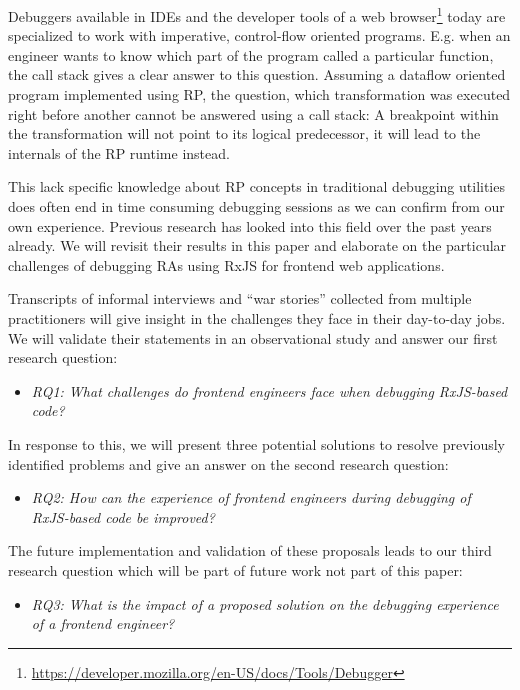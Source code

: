 \documentclass[12pt,a4paper]{article}
\begin{document}
Debuggers available in IDEs and the developer tools of a web browser\footnote{\url{https://developer.mozilla.org/en-US/docs/Tools/Debugger}} today are specialized to work with imperative, control-flow oriented programs. E.g. when an engineer wants to know which part of the program called a particular function, the call stack gives a clear answer to this question. Assuming a dataflow oriented program implemented using RP, the question, which transformation was executed right before another cannot be answered using a call stack: A breakpoint within the transformation will not point to its logical predecessor, it will lead to the internals of the RP runtime instead.

This lack specific knowledge about RP concepts in traditional debugging utilities does often end in time consuming debugging sessions as we can confirm from our own experience. Previous research has looked into this field \cite{10.1145/2577080.2577083} \cite{10.1145/2884781.2884815} \cite{10.1145/3180155.3180156} over the past years already. We will revisit their results in this paper and elaborate on the particular challenges of debugging RAs using RxJS for frontend web applications.

Transcripts of informal interviews and ``war stories'' collected from multiple practitioners will give insight in the challenges they face in their day-to-day jobs. We will validate their statements in an observational study and answer our first research question:

\begin{itemize}
	\item \emph{RQ1: What challenges do frontend engineers face when debugging RxJS-based code?}
\end{itemize}

In response to this, we will present three potential solutions to resolve previously identified problems and give an answer on the second research question:

\begin{itemize}
	\item \emph{RQ2: How can the experience of frontend engineers during debugging of RxJS-based code be improved?}
\end{itemize}

The future implementation and validation of these proposals leads to our third research question which will be part of future work not part of this paper:

\begin{itemize}
	\item \emph{RQ3: What is the impact of a proposed solution on the debugging experience of a frontend engineer?}
\end{itemize}
\end{document}
